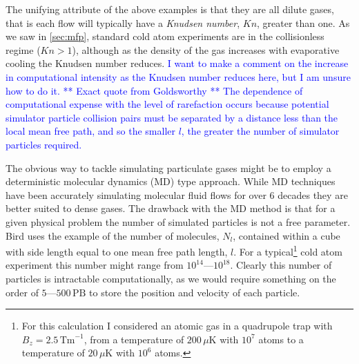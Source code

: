 The unifying attribute of the above examples is that they are all dilute gases, that is each flow will typically have a \emph{Knudsen number}, $Kn$, greater than one.
As we saw in \autoref{sec:mfp}, standard cold atom experiments are in the collisionless regime ($Kn>1$), although as the density of the gas increases with evaporative cooling the Knudsen number reduces.
\textcolor{blue}{I want to make a comment on the increase in computational intensity as the Knudsen number reduces here, but I am unsure how to do it. ** Exact quote from Goldsworthy ** The dependence of computational expense with the level of rarefaction occurs because potential simulator particle collision pairs must be separated by a distance less than the local mean free path, and so the smaller $l$, the greater the number of simulator particles required. }

The obvious way to tackle simulating particulate gases might be to employ a deterministic molecular dynamics (MD) \cite{Alder1957} type approach.
While MD techniques have been accurately simulating molecular fluid flows for over 6 decades \cite{?,?,?} they are better suited to dense gases.
The drawback with the MD method is that for a given physical problem the number of simulated particles is not a free parameter.
Bird uses the example of the number of molecules, $N_l$, contained within a cube with side length equal to one mean free path length, $l$.
For a typical\footnote{For this calculation I considered an atomic gas in a quadrupole trap with $B_z=2.5\,\mathrm{Tm}^{-1}$, from a temperature of $200\,\mu\mathrm{K}$ with $10^7$ atoms to a temperature of $20\,\mu\mathrm{K}$ with $10^6$ atoms.} cold atom experiment this number might range from $10^{14}$---$10^{18}$.
Clearly this number of particles is intractable computationally, as we would require something on the order of $5$---$500\,\mathrm{PB}$ to store the position and velocity of each particle.

